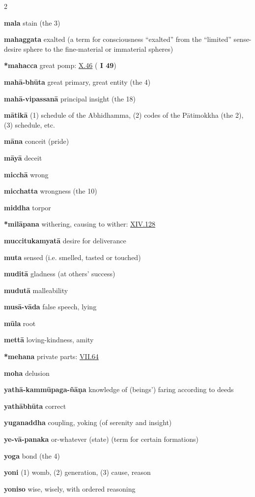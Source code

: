 \begin{multicols}{2}
\begin{vismHanging}
\par\textbf{mala} stain (the 3)
\par\textbf{mahaggata} exalted (a term for consciousness “exalted” from the “limited” sense-desire sphere to the fine-material or immaterial spheres) 
\par\textbf{*mahacca} great pomp: \hyperlink{X.46}{X.46}{} (\textbf{\cite{D} I 49})
\par\textbf{mahā-bhūta} great primary, great entity (the 4) 
\par\textbf{mahā-vipassanā} principal insight (the 18)
\par\textbf{mātikā} (1) schedule of the Abhidhamma, (2) codes of the Pātimokkha (the 2), (3) schedule, etc. 
\par\textbf{māna} conceit (pride)
\par\textbf{māyā} deceit
\par\textbf{micchā} wrong
\par\textbf{micchatta} wrongness (the 10)
\par\textbf{middha} torpor
\par\textbf{*milāpana} withering, causing to wither: \hyperlink{XIV.128}{XIV.128}{} 
\par\textbf{muccitukamyatā} desire for deliverance
\par\textbf{muta} sensed (i.e. smelled, tasted or touched) 
\par\textbf{muditā} gladness (at others’ success)
\par\textbf{mudutā} malleability
\par\textbf{musā-vāda} false speech, lying
\par\textbf{mūla} root
\par\textbf{mettā} loving-kindness, amity
\par\textbf{*mehana} private parts: \hyperlink{VII.64}{VII.64}{}
\par\textbf{moha} delusion
\par\textbf{yathā-kammūpaga-ñāṇa} knowledge of (beings’) faring according to deeds 
\par\textbf{yathābhūta} correct
\par\textbf{yuganaddha} coupling, yoking (of serenity and insight) 
\par\textbf{ye-vā-panaka} or-whatever (state) (term for certain formations) 
\par\textbf{yoga} bond (the 4)
\par\textbf{yoni} (1) womb, (2) generation, (3) cause, reason 
\par\textbf{yoniso} wise, wisely, with ordered reasoning

\end{vismHanging}
\end{multicols}

